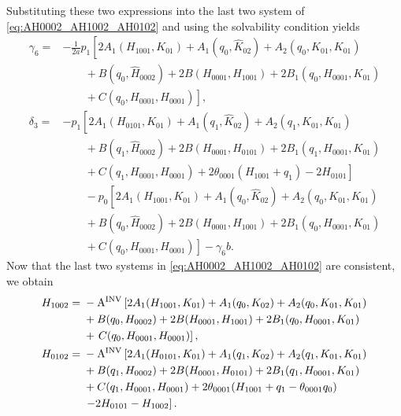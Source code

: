 Substituting these two expressions into the last two system of \cref{eq:AH0002_AH1002_AH0102} and
using the solvability condition yields
\begin{equation*}
\begin{aligned}
				\gamma_6 ={}& -\frac1{2a} p_1 \left[ 2A_1(H_{1001},K_{01}) +
				A_1(q_0,\hat K_{02}) + A_2(q_0,K_{01},K_{01}) \right. \\
	& \qquad + B(q_0,\hat H_{0002}) + 2B(H_{0001},H_{1001}) +
				2B_1(q_0,H_{0001},K_{01}) \\
  & \left. \qquad + C(q_0,H_{0001},H_{0001}) \right],  \\
\delta_3 ={}& -p_1 \left[ 2A_1(H_{0101},K_{01}) + A_1(q_1,\hat K_{02}) +
    A_2(q_1,K_{01},K_{01}) \right. \\
	& \qquad + B(q_1,\hat H_{0002}) + 2B(H_{0001},H_{0101}) +
	    2B_1(q_1,H_{0001},K_{01}) \\
	& \left. \qquad +  C(q_1,H_{0001},H_{0001}) +2\theta_{0001} (H_{1001} + q_1) -
	  2H_{0101} \right] \\
	& \qquad - p_0 \left[ 2A_1(H_{1001},K_{01}) + A_1(q_0,\hat K_{02}) +
    A_2(q_0,K_{01},K_{01}) \right. \\ 
	& \qquad + B(q_0,\hat H_{0002}) + 2B(H_{0001},H_{1001}) +
    2B_1(q_0,H_{0001},K_{01}) \\
  & \left. \qquad + C(q_0,H_{0001},H_{0001}) \right] - \gamma_6 b.
\end{aligned}
\end{equation*}
Now that the last two systems in \cref{eq:AH0002_AH1002_AH0102} are consistent,
we obtain
\begin{equation*}
\begin{aligned}
H_{1002}={}& -\operatorname{A^{\text{INV}}} \left[ 2A_1(H_{1001},K_{01}) + A_1(q_0,K_{02}) +
				A_2(q_0,K_{01},K_{01}) \right. \\ 
			  & + B(q_0,H_{0002}) + 2B(H_{0001},H_{1001}) +
				2B_1(q_0,H_{0001},K_{01})  \\
				& + \left. C(q_0,H_{0001},H_{0001}) \right], \\
H_{0102}={}& -\operatorname{A^{\text{INV}}} \left[ 2A_1(H_{0101},K_{01}) + A_1(q_1,K_{02}) +
				A_2(q_1,K_{01},K_{01}) \right. \\
  & + B(q_1,H_{0002}) + 2B(H_{0001},H_{0101}) + 2B_1(q_1,H_{0001},K_{01}) \\
	& + C(q_1,H_{0001},H_{0001}) +2\theta_{0001} (H_{1001} + q_1 -
	  \theta_{0001}q_0)  \\
	& \left. - 2H_{0101} - H_{1002} \right].
\end{aligned}
\end{equation*}

